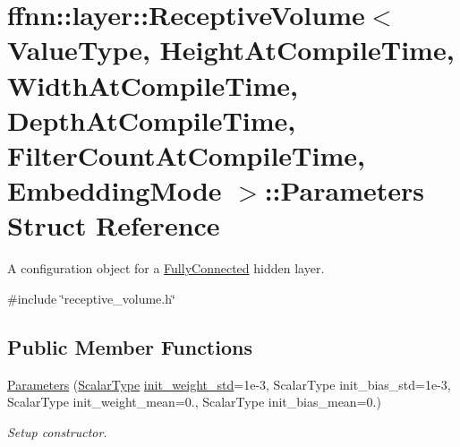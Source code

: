 \hypertarget{structffnn_1_1layer_1_1_receptive_volume_1_1_parameters}{\section{ffnn\-:\-:layer\-:\-:Receptive\-Volume$<$ Value\-Type, Height\-At\-Compile\-Time, Width\-At\-Compile\-Time, Depth\-At\-Compile\-Time, Filter\-Count\-At\-Compile\-Time, Embedding\-Mode $>$\-:\-:Parameters Struct Reference}
\label{structffnn_1_1layer_1_1_receptive_volume_1_1_parameters}
}


A configuration object for a \hyperlink{classffnn_1_1layer_1_1_fully_connected}{Fully\-Connected} hidden layer.  




{\ttfamily \#include \char`\"{}receptive\-\_\-volume.\-h\char`\"{}}

\subsection*{Public Member Functions}
\begin{DoxyCompactItemize}
\item 
\hyperlink{structffnn_1_1layer_1_1_receptive_volume_1_1_parameters_ae1dd9fa72bd4871addcec9b5ffd3a188}{Parameters} (\hyperlink{classffnn_1_1layer_1_1internal_1_1_interface_a7f834e3365e5199bcbcd16d9abd63941}{Scalar\-Type} \hyperlink{structffnn_1_1layer_1_1_receptive_volume_1_1_parameters_a70c92940ea42992f3ec993e699fb4910}{init\-\_\-weight\-\_\-std}=1e-\/3, Scalar\-Type init\-\_\-bias\-\_\-std=1e-\/3, Scalar\-Type init\-\_\-weight\-\_\-mean=0., Scalar\-Type init\-\_\-bias\-\_\-mean=0.)
\begin{DoxyCompactList}\small\item\em Setup constructor. \end{DoxyCompactList}\end{DoxyCompactItemize}
